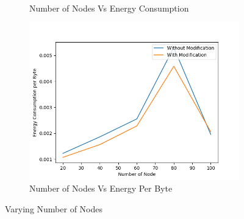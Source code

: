 \begin{figure}[h]
\begin{subfigure}{.5\textwidth}
     \caption{Number of Nodes Vs Energy Consumption}
     \label{node_energy_modified}
\end{subfigure}
\begin{subfigure}{.5\textwidth}
  \centering
  \includegraphics[width=.8\linewidth]{modified_fig/NumberofNodevsEnergyConsumptionperByte.png}
     \caption{Number of Nodes Vs Energy Per Byte}
     \label{node_energy_modified_per_byte}
\end{subfigure}
\caption{Varying Number of Nodes}
\label{fig:varyingNode}
\end{figure}

